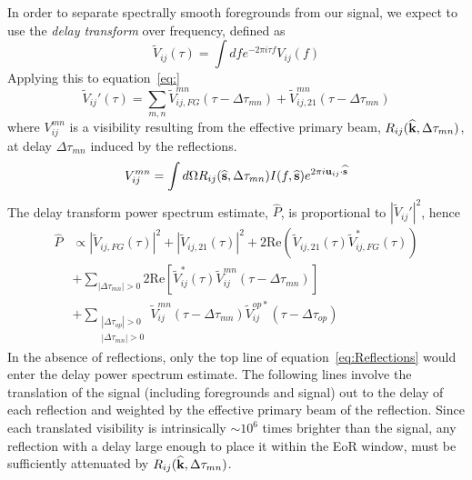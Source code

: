 \documentclass[onecolumn]{emulateapj}
\begin{document}
In order to separate spectrally smooth foregrounds from our signal, we expect to use the {\it delay transform} over frequency, defined as \citep{Parsons:2012}
\begin{equation}
\widetilde{V}_{ij}(\tau) = \int d f e^{-2 \pi i \tau f} V_{ij}(f)
\end{equation}
Applying this to equation~\ref{eq:}
\begin{equation}
\widetilde{V}_{ij}'(\tau) = \sum_{m,n} \widetilde{V}_{ij,FG}^{mn}(\tau - \Delta \tau_{mn}) + \widetilde{V}_{ij,21}^{mn}(\tau - \Delta \tau_{mn})
\end{equation}
where $V_{ij}^{mn}$ is a visibility resulting from the effective primary beam, $R_{ij}({\bf \widehat{k}},\Delta \tau_{mn})$, at delay $\Delta \tau_{mn}$ induced by the reflections.
\begin{equation}
V_{ij}^{mn} = \int d \Omega R_{ij}({\bf \widehat{s}},\Delta \tau_{mn}) I(f,{\bf \widehat{s}})e^{2 \pi i {\bf u}_{ij} \cdot {\bf \widehat{s}}}
\end{equation}
The delay transform power spectrum estimate, $\widehat{P}$, is proportional to $|\widetilde{V}_{ij}'|^2$, hence 
\begin{align}\label{eq:Reflections}
\widehat{P} & \propto |\widetilde{V}_{ij,FG}(\tau)|^2 + |\widetilde{V}_{ij,21}(\tau)|^2 + 2 \text{Re}(\widetilde{V}_{ij,21}(\tau)\widetilde{V}_{ij,FG}^*(\tau)) \nonumber \\
&+ \sum_{|\Delta \tau_{mn}| > 0} 2 \text{Re} \left[   \widetilde{V}^*_{ij} (\tau) \widetilde{V}^{mn}_{ij} (\tau - \Delta \tau_{mn})  \right] \nonumber \\
&+ \sum_{\substack{|\Delta \tau_{op}|>0\\|\Delta \tau_{mn}|>0}} \widetilde{V}^{mn}_{ij} (\tau - \Delta \tau_{mn}) \widetilde{V}^{op*}_{ij}(\tau - \Delta \tau_{op})
\end{align}
In the absence of reflections, only the top line of equation~\ref{eq:Reflections} would enter the delay power spectrum estimate. The following lines involve the translation of the signal (including foregrounds and signal) out to the delay of each reflection and weighted by the effective primary beam of the reflection. Since each translated visibility is intrinsically $\sim 10^6$ times brighter than the signal, any reflection with a delay large enough to place it within the EoR window, must be sufficiently attenuated by $R_{ij}({\bf \widehat{k}},\Delta \tau_{mn})$.%
\end{document}
